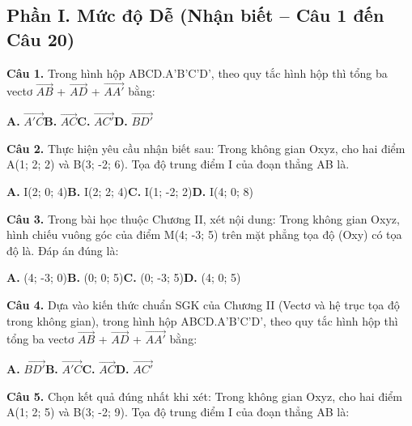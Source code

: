 \documentclass[11pt,a4paper]{article}
\begin{document}
\subsection*{\color{accent} Phần I. Mức độ Dễ (Nhận biết -- Câu 1 đến Câu 20)}
\textbf{\color{primary} Câu 1.} Trong hình hộp ABCD.A'B'C'D', theo quy tắc hình hộp thì tổng ba vectơ $\overrightarrow{AB}$ + $\overrightarrow{AD}$ + $\overrightarrow{AA'}$ bằng:\par
\hspace*{1.5em}\textbf{A.} $\overrightarrow{A'C}$\quad\quad \textbf{B.} $\overrightarrow{AC}$\quad\quad \textbf{C.} $\overrightarrow{AC'}$\quad\quad \textbf{D.} $\overrightarrow{BD'}$\par\vspace{2pt}
\textbf{\color{primary} Câu 2.} Thực hiện yêu cầu nhận biết sau: Trong không gian Oxyz, cho hai điểm A(1; 2; 2) và B(3; -2; 6). Tọa độ trung điểm I của đoạn thẳng AB là.\par
\hspace*{1.5em}\textbf{A.} I(2; 0; 4)\quad\quad \textbf{B.} I(2; 2; 4)\quad\quad \textbf{C.} I(1; -2; 2)\quad\quad \textbf{D.} I(4; 0; 8)\par\vspace{2pt}
\textbf{\color{primary} Câu 3.} Trong bài học thuộc Chương II, xét nội dung: Trong không gian Oxyz, hình chiếu vuông góc của điểm M(4; -3; 5) trên mặt phẳng tọa độ (Oxy) có tọa độ là. Đáp án đúng là:\par
\hspace*{1.5em}\textbf{A.} (4; -3; 0)\quad\quad \textbf{B.} (0; 0; 5)\quad\quad \textbf{C.} (0; -3; 5)\quad\quad \textbf{D.} (4; 0; 5)\par\vspace{2pt}
\textbf{\color{primary} Câu 4.} Dựa vào kiến thức chuẩn SGK của Chương II (Vectơ và hệ trục tọa độ trong không gian), trong hình hộp ABCD.A'B'C'D', theo quy tắc hình hộp thì tổng ba vectơ $\overrightarrow{AB}$ + $\overrightarrow{AD}$ + $\overrightarrow{AA'}$ bằng:\par
\hspace*{1.5em}\textbf{A.} $\overrightarrow{BD'}$\quad\quad \textbf{B.} $\overrightarrow{A'C}$\quad\quad \textbf{C.} $\overrightarrow{AC}$\quad\quad \textbf{D.} $\overrightarrow{AC'}$\par\vspace{2pt}
\textbf{\color{primary} Câu 5.} Chọn kết quả đúng nhất khi xét: Trong không gian Oxyz, cho hai điểm A(1; 2; 5) và B(3; -2; 9). Tọa độ trung điểm I của đoạn thẳng AB là:\par
\end{document}
